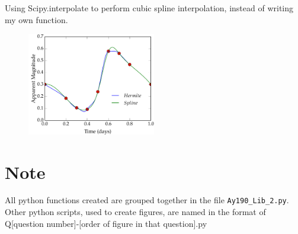 \documentclass[11pt,letterpaper]{article}
\begin{document}
Using Scipy.interpolate to perform cubic spline interpolation, instead of writing my own function.

\begin{figure}[h!]
	\centering
	\includegraphics[width=0.5\textwidth]{SplineInter}
	\caption{}
	\label{fig:SpineInter}
\end{figure}

 
 \section{Note}
 All python functions created are grouped together in the file \texttt{Ay190\_Lib\_2.py}. Other python scripts, used to create figures, are named in the
 format of Q[question number]-[order of figure in that question].py
\end{document}
